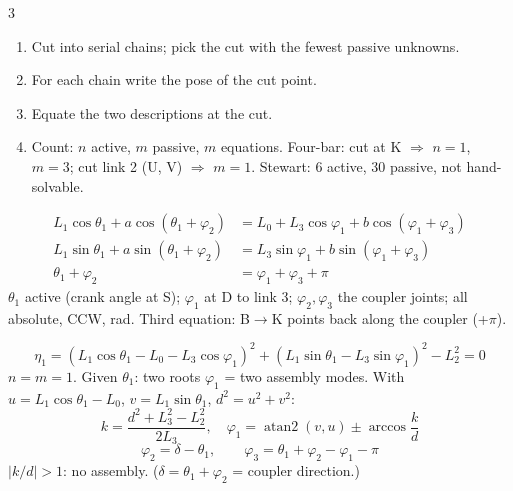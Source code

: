 \begin{multicols}{3}
\begin{recipe}
\begin{enumerate}
\item Cut into serial chains; pick the cut with the fewest passive unknowns.
\item For each chain write the pose of the cut point.
\item Equate the two descriptions at the cut.
\item Count: $n$ active, $m$ passive, $m$ equations. Four-bar: cut at K $\Rightarrow$ $n=1$, $m=3$; cut link 2 (U, V) $\Rightarrow$ $m=1$. Stewart: 6 active, 30 passive, not hand-solvable.
\end{enumerate}
\end{recipe}
\begin{fbx}
\[\begin{aligned}
L_1\cos\theta_1+a\cos(\theta_1+\varphi_2)&=L_0+L_3\cos\varphi_1+b\cos(\varphi_1+\varphi_3)\\
L_1\sin\theta_1+a\sin(\theta_1+\varphi_2)&=L_3\sin\varphi_1+b\sin(\varphi_1+\varphi_3)\\
\theta_1+\varphi_2&=\varphi_1+\varphi_3+\pi
\end{aligned}\]
$\theta_1$ active (crank angle at {S}); $\varphi_1$ at {D} to link 3; $\varphi_2,\varphi_3$ the coupler joints; all absolute, CCW, rad. Third equation: B$\to$K points back along the coupler (+$\pi$). \chk
\end{fbx}
\begin{fbx}
\[\eta_1=(L_1\cos\theta_1-L_0-L_3\cos\varphi_1)^2+(L_1\sin\theta_1-L_3\sin\varphi_1)^2-L_2^2=0\]
$n=m=1$. Given $\theta_1$: two roots $\varphi_1$ = two assembly modes. With $u=L_1\cos\theta_1-L_0$, $v=L_1\sin\theta_1$, $d^2=u^2+v^2$:
\[k=\frac{d^2+L_3^2-L_2^2}{2L_3},\quad\varphi_1=\operatorname{atan2}(v,u)\pm\arccos\frac kd\]
\[\varphi_2=\delta-\theta_1,\qquad\varphi_3=\theta_1+\varphi_2-\varphi_1-\pi\]
$\lvert k/d\rvert>1$: no assembly. ($\delta=\theta_1+\varphi_2$ = coupler direction.)
\end{fbx}


\end{multicols}
